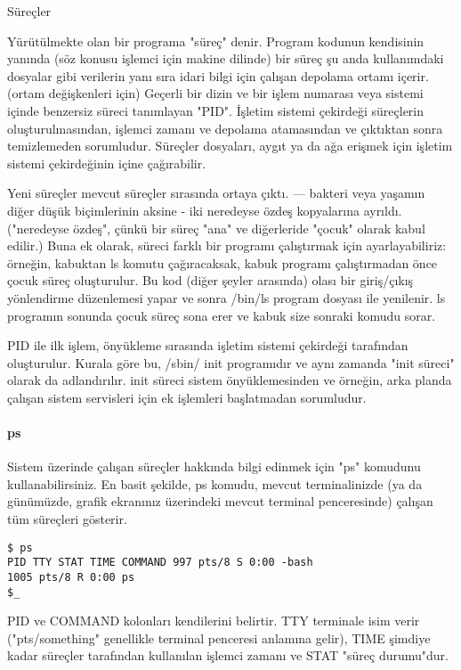 \begin{section}{Süreçler}

Yürütülmekte olan bir programa "süreç" denir. Program kodunun kendisinin yanında (söz konusu işlemci için makine dilinde) bir süreç şu anda kullanımdaki dosyalar gibi verilerin yanı sıra idari bilgi için çalışan depolama ortamı içerir. (ortam değişkenleri için) Geçerli bir dizin ve bir işlem numarası veya sistemi içinde benzersiz süreci tanımlayan "PID". İşletim sistemi çekirdeği süreçlerin oluşturulmasından, işlemci zamanı ve  depolama atamasından ve çıktıktan sonra temizlemeden sorumludur. Süreçler dosyaları, aygıt ya da ağa erişmek için işletim sistemi çekirdeğinin içine çağırabilir.

Yeni süreçler mevcut süreçler sırasında ortaya çıktı. — bakteri veya yaşamın diğer düşük biçimlerinin aksine - iki neredeyse özdeş kopyalarına ayrıldı. ("neredeyse özdeş", çünkü bir süreç "ana" ve diğerleride "çocuk" olarak kabul edilir.) Buna ek olarak, süreci farklı bir programı çalıştırmak için ayarlayabiliriz: örneğin, kabuktan ls komutu çağıracaksak, kabuk programı çalıştırmadan önce çocuk süreç oluşturulur. Bu kod (diğer şeyler arasında) olası bir giriş/çıkış yönlendirme düzenlemesi yapar ve sonra /bin/ls program dosyası ile yenilenir. ls programın sonunda çocuk süreç sona erer ve kabuk size sonraki komudu sorar.

PID ile ilk işlem, önyükleme sırasında işletim sistemi çekirdeği tarafından oluşturulur. Kurala göre bu, /sbin/ init  programıdır ve aynı zamanda "init süreci" olarak da adlandırılır. init süreci sistem önyüklemesinden ve örneğin, arka planda çalışan sistem servisleri için ek işlemleri başlatmadan sorumludur.

\paragraph{ps}{Sistem üzerinde çalışan süreçler hakkında bilgi edinmek için "ps" komudunu kullanabilirsiniz. En basit şekilde, ps komudu, mevcut terminalinizde (ya da günümüzde, grafik ekranınız üzerindeki mevcut terminal penceresinde) çalışan tüm süreçleri gösterir.}

\begin{verbatim}
$ ps
PID TTY STAT TIME COMMAND 997 pts/8 S 0:00 -bash
1005 pts/8 R 0:00 ps 
$_
\end{verbatim}

PID ve COMMAND kolonları kendilerini belirtir. TTY terminale isim verir ("pts/something" genellikle terminal penceresi anlamına gelir), TIME şimdiye kadar süreçler tarafından kullanılan işlemci zamanı  ve STAT "süreç durumu"dur. 


\end{section}
